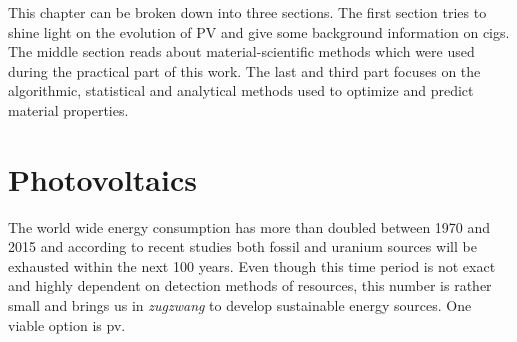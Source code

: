 
This chapter can be broken down into three sections. 
The first section tries to shine light on the evolution of PV and give some background information on \gls{cigs}.
The middle section reads about material-scientific methods which were used during the practical part of this work. 
The last and third part focuses on the algorithmic, statistical and analytical methods used to optimize and predict material properties. 

\section{Photovoltaics}
The world wide energy consumption has more than doubled between 1970 and 2015\cite{BP2017} 
and according to recent studies both fossil\cite{BGR2017} and uranium sources\cite{Uran2006} 
will be exhausted within the next 100 years. 
Even though this time period is not exact and highly dependent on detection methods of resources, 
this number is rather small and brings us in \textit{zugzwang} to develop sustainable energy sources. 
One viable option is \gls{pv}.

